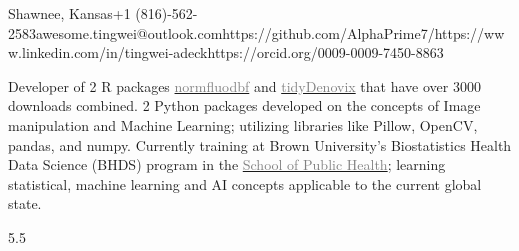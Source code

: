 \documentclass[9pt]{adeckcv} %
\begin{document}

         {Shawnee, Kansas}{+1 (816)-562-2583}{awesome.tingwei@outlook.com}{https://github.com/AlphaPrime7/}{https://www.linkedin.com/in/tingwei-adeck}{https://orcid.org/0009-0009-7450-8863}



\begin{minipage}[t]{0.4\textwidth}
	\vspace{-\baselineskip} 
	
	{Developer of 2 R packages \href{https://alphaprime7.github.io/normfluodbf/}{\textcolor{gray}{normfluodbf}} and \href{https://alphaprime7.github.io/tidyDenovix/}{\textcolor{gray}{tidyDenovix}} that have over 3000 downloads combined. 2 Python packages developed on the concepts of Image manipulation and Machine Learning; utilizing libraries like Pillow, OpenCV, pandas, and numpy. }
	{Currently training at Brown University's Biostatistics Health Data Science (BHDS) program in the \href{https://sph.brown.edu/}{\textcolor{gray}{School of Public Health}}; \space learning statistical, machine learning and AI concepts applicable to the current global state. }
\end{minipage}
\hfill %
\begin{minipage}[t]{0.5\textwidth} %
	\vspace{-\baselineskip} %
	\begin{barchart}{5.5}
	\end{barchart}
\end{minipage}
\end{document}
